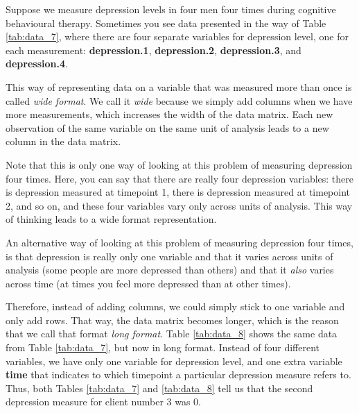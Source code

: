 Suppose we measure depression levels in four men four times during cognitive behavioural therapy. Sometimes you see data presented in the way of Table \ref{tab:data_7}, where there are four separate variables for depression level, one for each measurement: \textbf{depression.1}, \textbf{depression.2}, \textbf{depression.3}, and \textbf{depression.4}.

\begin{kframe}


{\ttfamily\noindent\bfseries{}}\end{kframe}

This way of representing data on a variable that was measured more than once is called \textit{wide format}. We call it \textit{wide} because we simply add columns when we have more measurements, which increases the width of the data matrix. Each new observation of the same variable on the same unit of analysis leads to a new column in the data matrix. 

Note that this is only one way of looking at this problem of measuring depression four times. Here, you can say that there are really four depression variables: there is depression measured at timepoint 1, there is depression measured at timepoint 2, and so on, and these four variables vary only across units of analysis. This way of thinking leads to a wide format representation. 

An alternative way of looking at this problem of measuring depression four times, is that depression is really only one variable and that it varies across units of analysis (some people are more depressed than others) and that it \textit{also} varies across time (at times you feel more depressed than at other times).  

Therefore, instead of adding columns, we could simply stick to one variable and only add rows. That way, the data matrix becomes longer, which is the reason that we call that format \textit{long format}. Table \ref{tab:data_8} shows the same data from Table \ref{tab:data_7}, but now in long format. Instead of four different variables, we have only one variable for depression level, and one extra variable \textbf{time} that indicates to which timepoint a particular depression measure refers to. Thus, both Tables \ref{tab:data_7} and \ref{tab:data_8} tell us that the second depression measure for client number 3 was 0.

\begin{kframe}


{\ttfamily\noindent\bfseries{}}\end{kframe}


